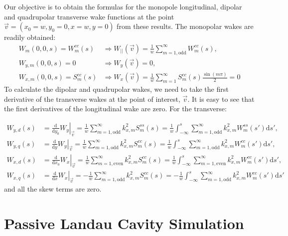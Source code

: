 \begin{apendicesenv}
    Our objective is to obtain the formulas for the monopole longitudinal, dipolar and quadrupolar transverse wake functions at the point $\vec{v} = (x_0=w,y_0=0,x=w,y=0)$ from these results. The monopolar wakes are readily obtained:
    \begin{align}
		W_m(0,0,s) = W^{cc}_m(s) &\Rightarrow W_{||}(\vec{v}) = \frac1w\sum^\infty_{m=1,\mathrm{odd}} W^{cc}_m(s), \\[4mm]
		W_{y,m}(0,0,s) = 0 &\Rightarrow W_y(\vec{v}) = 0, \\[4mm]
		W_{x,m}(0,0,s) = S^{cc}_m(s) &\Rightarrow W_x(\vec{v}) = \frac1w\sum^\infty_{m=1} S^{cc}_m(s)\frac{\sin(m\pi)}{2} = 0
    \end{align}
    To calculate the dipolar and quadrupolar wakes, we need to take the first derivative of the transverse wakes at the point of interest, $\vec{v}$. It is easy to see that the first derivatives of the longitudinal wake are zero. For the transverse:

    \begin{align}
		W_{y,d}(s) &= \left.\frac{\mathrm{d}}{\mathrm{d}y_0}W_y\right|_{\vec{v}} = \frac1w\sum^\infty_{m=1,\mathrm{odd}} k_{x,m}^2 S^{ss}_m(s) = \frac1w\int_{-\infty}^s\sum^\infty_{m=1,\mathrm{odd}} k_{x,m}^2 W^{ss}_m(s') \mathrm{d}s',\\[4mm]
		W_{y,q}(s) &= \left.\frac{\mathrm{d}}{\mathrm{d}y}W_y\right|_{\vec{v}} = \frac1w\sum^\infty_{m=1,\mathrm{odd}} k_{x,m}^2 S^{cc}_m(s) = \frac1w\int_{-\infty}^s\sum^\infty_{m=1,\mathrm{odd}} k_{x,m}^2 W^{cc}_m(s') \mathrm{d}s', \\[4mm]
		W_{x,d}(s) &= \left.\frac{\mathrm{d}}{\mathrm{d}x_0}W_x\right|_{\vec{v}} = \frac1w\sum^\infty_{m=1,\mathrm{even}} k_{x,m}^2 S^{cc}_m(s) = \frac1w\int_{-\infty}^s\sum^\infty_{m=1,\mathrm{even}}k_{x,m}^2 W^{cc}_m(s') \mathrm{d}s', \\[4mm]
		W_{x,q}(s) &= \left.\frac{\mathrm{d}}{\mathrm{d}x}W_x\right|_{\vec{v}} = -\frac1w\sum^\infty_{m=1,\mathrm{odd}} k_{x,m}^2 S^{cc}_m(s) =-\frac1w\int_{-\infty}^s\sum^\infty_{m=1,\mathrm{odd}} k_{x,m}^2 W^{cc}_m(s') \mathrm{d}s'
    \end{align}
    and all the skew terms are zero.


\chapter{Passive Landau Cavity Simulation}\label{app:passive_landau_cavity}


\end{apendicesenv}
